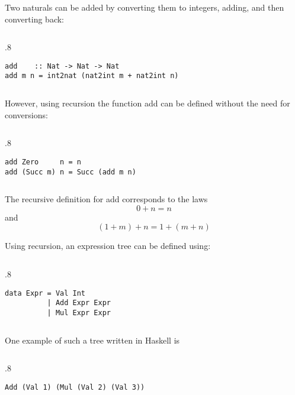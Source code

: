 \documentclass{beamer}
\newenvironment{codeblock}[1][.8]{%
\begin{columns}
\begin{column}{#1\linewidth}
\begin{exampleblock}{}}{%
\end{exampleblock}
\end{column}
\end{columns}}
\newenvironment{execblock}[1][.8]{%
\begin{columns}
\begin{column}{#1\linewidth}
\begin{block}{}}{%
\end{block}
\end{column}
\end{columns}}
\def\frameskip{\vskip 0.1in}
\begin{document}
\begin{frame}[fragile]

Two naturals can be added by converting them to 
integers, adding, and then converting back: 

\frameskip

\begin{codeblock}
\vspace{-2ex}
\begin{verbatim}
add    :: Nat -> Nat -> Nat 
add m n = int2nat (nat2int m + nat2int n) 
\end{verbatim}
\vspace{-2ex}
\end{codeblock}
\frameskip
However, using recursion the function add can be 
defined without the need for conversions: 
\frameskip
\begin{codeblock}
\vspace{-2ex}
\begin{verbatim}
add Zero     n = n 
add (Succ m) n = Succ (add m n) 
\end{verbatim}
\vspace{-2ex}
\end{codeblock}
\frameskip
The recursive definition for add corresponds to 
the laws 
$$0+n = n$$ and $$(1+m)+n = 1+(m+n)$$
\end{frame}

\begin{frame}[fragile]

\Large
Using recursion, an expression tree can be defined using:

\frameskip

\begin{codeblock}
\vspace{-2ex}
\begin{verbatim}
data Expr = Val Int 
          | Add Expr Expr 
          | Mul Expr Expr 
\end{verbatim}
\vspace{-2ex}
\end{codeblock}
\frameskip

One example of such a tree written in Haskell is
\frameskip
\begin{execblock}
\begin{verbatim}
Add (Val 1) (Mul (Val 2) (Val 3))
\end{verbatim}
\end{execblock}
\frameskip


\end{frame}
\end{document}
